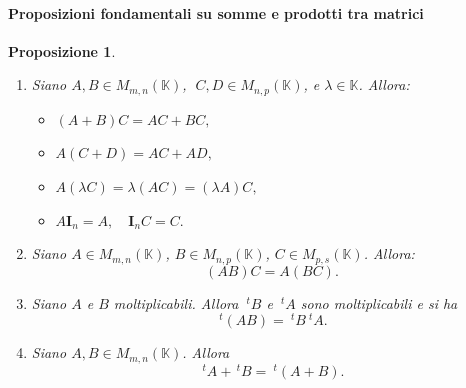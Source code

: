 \documentclass{article}
\theoremstyle{plain}
\newtheorem{prop}[thm]{Proposizione}
\theoremstyle{definition}
\theoremstyle{remark}
\begin{document}
\paragraph{Proposizioni fondamentali su somme e prodotti tra matrici}
\begin{bxthm}
\begin{prop}\label{propimp}\hfill
    \begin{enumerate}
        \item Siano \( A, B \in M_{m,n}(\mathbb{K}) \), \(\; C, D \in M_{n,p}(\mathbb{K}) \), e \( \lambda \in \mathbb{K} \). Allora:
        \begin{itemize}
            \item $(A + B)C = AC + BC, $
            \item $A(C + D) = AC + AD,$
            \item $A(\lambda C) = \lambda (AC) = (\lambda A) C,$
            \item $A \mathbf{I}_n = A, \quad \mathbf{I}_n C = C.$
        \end{itemize}
        \item Siano \( A \in M_{m,n}(\mathbb{K}) \), \( B \in M_{n,p}(\mathbb{K}) \), \( C \in M_{p,s}(\mathbb{K}) \). Allora: \[(AB) C = A(BC).\]
        \item Siano \( A \) e \( B \) moltiplicabili. Allora \( \ ^{t}B \) e \( \ ^{t}A \) sono moltiplicabili e si ha \[\ ^{t}(AB) = \ ^{t}B\ ^{t}A.\]
        \item Siano \( A, B \in M_{m,n}(\mathbb{K}) \). Allora \[\ ^{t}A + \, ^{t}B = \ ^{t}(A + B).\]
    \end{enumerate}
\end{prop}
\end{bxthm}
\end{document}
